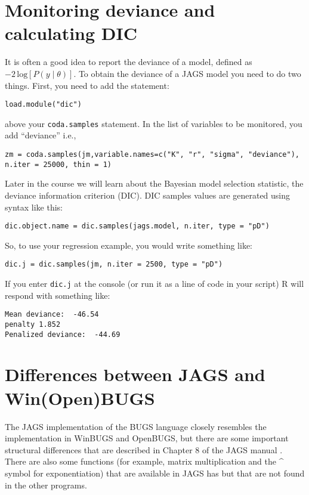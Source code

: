 \documentclass[12pt,english]{article}
\begin{document}
\section{Monitoring deviance and calculating DIC}

It is often a good idea to report the deviance of a model, defined as $-2\,\textrm{log}\left[P\left(y\mid\theta\right)\right]$. To obtain the deviance of a JAGS model you need to do two things. First, you need to add the statement:

\begin{Verbatim}
load.module("dic")
\end{Verbatim}

\noindent above your \texttt{coda.samples} statement. In the list of variables to be monitored, you add \enquote{deviance} i.e.,

\begin{Verbatim}
zm = coda.samples(jm,variable.names=c("K", "r", "sigma", "deviance"), 
n.iter = 25000, thin = 1)
\end{Verbatim}

\noindent Later in the course we will learn about the Bayesian model selection statistic, the deviance information criterion (DIC). DIC samples values are generated using syntax like this:

\begin{Verbatim}
dic.object.name = dic.samples(jags.model, n.iter, type = "pD")
\end{Verbatim}

\noindent So, to use your regression example, you would write something like:

\begin{Verbatim}
dic.j = dic.samples(jm, n.iter = 2500, type = "pD")
\end{Verbatim}

\noindent If you enter \texttt{dic.j} at the console (or run it as a line of code in your script) R will respond with something like:

\begin{Verbatim}
Mean deviance:  -46.54
penalty 1.852
Penalized deviance:  -44.69
\end{Verbatim}

\section{Differences between JAGS and Win(Open)BUGS}

The JAGS implementation of the BUGS language closely resembles the implementation in WinBUGS and OpenBUGS, but there are some important structural differences that are described in Chapter 8 of the JAGS manual \citep{Plummer_mannual}. There are also some functions (for example, matrix multiplication and the \textasciicircum{} symbol for exponentiation) that are available in JAGS has but that are not found in the other programs.
\end{document}
